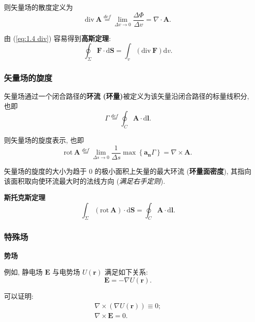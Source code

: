 则矢量场的散度定义为
\begin{equation} \label{eq:1.4 div}
    \mathrm{div}\ \bm{A}\stackrel{def}{=}\lim_{\Delta v\rightarrow 0}\frac{\Delta\Phi}{\Delta v}=\nabla\cdot\bm{A}.
\end{equation}

由 (\ref{eq:1.4 div}) 容易得到\textbf{高斯定理}:
\begin{equation}
    \oint_\Sigma\bm{F}\cdot\mathrm{d}\bm{S}=\int_{v}(\mathrm{div}\ \bm{F})\mathrm{d}v.
\end{equation}

\subsubsection{矢量场的旋度}
矢量场通过一个闭合路径的\textbf{环流 (环量)}被定义为该矢量沿闭合路径的标量线积分, 也即
\begin{equation}
    \Gamma\stackrel{def}{=}\oint_C\bm{A}\cdot\mathrm{d}\bm{l}.
\end{equation}

则矢量场的旋度表示, 也即
\begin{equation}
    \mathrm{rot}\ \bm{A}\stackrel{def}{=}\lim_{\Delta s\rightarrow 0}\frac{1}{\Delta s}\max\left\{\bm{a_n}\Gamma\right\}=\nabla\times\bm{A}.
\end{equation}

矢量场的旋度的大小为趋于 0 的极小面积上矢量的最大环流 (\textbf{环量面密度}), 其指向该面积取向使环流最大时的法线方向 (\textit{满足右手定则}).

\textbf{斯托克斯定理}
\begin{equation}
    \int_\Sigma(\mathrm{rot}\ \bm{A})\cdot\mathrm{d}\bm{S}=\oint_C\bm{A}\cdot\mathrm{d}\bm{l}.
\end{equation}

\subsubsection{特殊场}
\textbf{势场}

例如, 静电场 $\bm{E}$ 与电势场 $U(\bm{r})$ 满足如下关系:
\begin{equation}
    \bm{E}=-\nabla U(\bm{r}).
\end{equation}

可以证明:
\begin{gather}
    \nabla\times(\nabla U(\bm{r}))\equiv 0; \\
    \nabla\times\bm{E}=0. \label{eq:1.4 nabla times E}
\end{gather}


